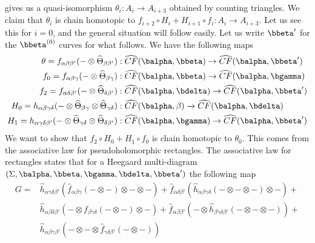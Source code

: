  gives us a quasi-isomorphism $\theta_i : A_i \rightarrow A_{i+3}$ obtained by counting triangles. We claim that $\theta_i$ is chain homotopic to $f_{i+2} \circ H_i + H_{i+1} \circ f_i : A_i \rightarrow A_{i+3}$. Let us see this for $i=0$, and the general situation will follow easily. Let us write $\bbeta'$ for the $\bbeta^{(0)}$ curves for what follows. We have the following maps
\begin{align*}
\theta = f_{\alpha\beta\beta'}(- \otimes \widehat{\Theta}_{\beta\beta'}) &: \widehat{CF}(\balpha,\bbeta) \rightarrow \widehat{CF}(\balpha,\bbeta') \\
f_0 = f_{\alpha\beta\gamma}(- \otimes \widehat{\Theta}_{\beta\gamma}) &: \widehat{CF}(\balpha,\bbeta) \rightarrow \widehat{CF}(\balpha,\bgamma) \\
f_2 = f_{\alpha\delta\beta'}(- \otimes \widehat{\Theta}_{\delta\beta'}) &: \widehat{CF}(\balpha,\bdelta) \rightarrow \widehat{CF}(\balpha,\bbeta') \\
H_0 = h_{\alpha\beta\gamma\delta}(- \otimes \widehat{\Theta}_{\beta\gamma} \otimes \widehat{\Theta}_{\gamma\delta}) &: \widehat{CF}(\balpha,\beta) \rightarrow \widehat{CF}(\balpha,\bdelta) \\
H_1 = h_{\alpha\gamma\delta\beta'}(- \otimes \widehat{\Theta}_{\gamma\delta} \otimes \widehat{\Theta}_{\delta\beta'}) &: \widehat{CF}(\balpha,\bgamma) \rightarrow \widehat{CF}(\balpha,\bbeta')
\end{align*}
We want to show that $f_2 \circ H_0 + H_1 \circ f_0$ is chain homotopic to $\theta_0$. This comes from the associative law for pseudoholomorphic rectangles. The associative law for rectangles states that for a Heegaard multi-diagram $(\Sigma,\balpha,\bbeta,\bgamma,\bdelta,\bbeta')$ the following map
\begin{equation}
\label{associativity law for rectangles on the chain level}
\begin{array}{ll}
	G= & \widehat{h}_{\alpha\gamma\delta\beta'}(\widehat{f}_{\alpha\beta\gamma}(- \otimes -) \otimes - \otimes -) + \widehat{f}_{\alpha\delta\beta'}(\widehat{h}_{\alpha\beta\gamma\delta}(- \otimes - \otimes -) \otimes -) +  \\
	& \widehat{h}_{\alpha\beta\delta\beta'}(- \otimes f_{\beta\gamma\delta}(- \otimes -) \otimes -) + \widehat{f}_{\alpha\beta\beta'}(- \otimes \widehat{h}_{\beta\gamma\delta\beta'}(-\otimes-\otimes-)) + \\
	& \widehat{h}_{\alpha\beta\gamma\beta'}(- \otimes - \otimes \widehat{f}_{\gamma\delta\beta'}(-\otimes-))
\end{array}
\end{equation}

